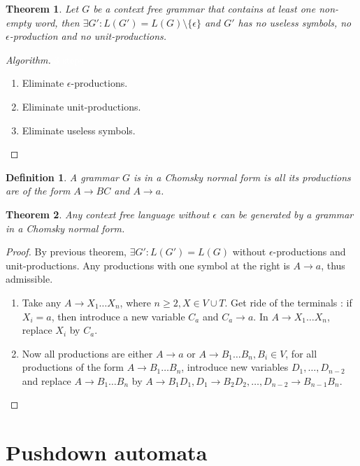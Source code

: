 \documentclass[a4paper,11pt]{article}
\newcommand{\white}[1]{{\textcolor{white}{#1}}}
\newtheorem{mydef}{Definition}
\newtheorem{thm}{Theorem}[section]
\begin{document}
\begin{thm}
  Let $G$ be a context free grammar that contains at least one non-empty word,
  then $\exists G' : L(G') = L(G) \setminus \{\epsilon\}$ and $G'$ has no
  useless symbols, no $\epsilon$-production and no unit-productions.
\end{thm}

\begin{proof}[Algorithm]
  \white{3 steps}
  \begin{enumerate}
  \item Eliminate $\epsilon$-productions.
  \item Eliminate unit-productions.
  \item Eliminate useless symbols.
  \end{enumerate}
\end{proof}

\begin{mydef}
  A grammar $G$ is in a Chomsky normal form is all its productions are of the
  form $A \to BC$ and $A \to a$.
\end{mydef}

\begin{thm}
  Any context free language without $\epsilon$ can be generated by a grammar in
  a Chomsky normal form.
\end{thm}

\begin{proof}
  By previous theorem, $\exists G' : L(G') = L(G)$ without
  $\epsilon$-productions and unit-productions. Any productions with one symbol
  at the right is $A \to a$, thus admissible.

  \begin{enumerate}
  \item Take any $A \to X_1 \dots X_n$, where $n \geq 2, X \in V \cup T$. Get ride of
    the terminals : if $X_i = a$, then introduce a new variable $C_a$ and $C_a \to
    a$. In $A \to X_1 \dots X_n$, replace $X_i$ by $C_a$.
  \item Now all productions are either $A \to a$ or $A \to B_1 \dots B_n, B_i
    \in V$, for all productions of the form $A \to B_1 \dots B_n$, introduce new
    variables $D_1,\dots,D_{n-2}$ and replace $A \to B_1 \dots B_n$ by $A \to
    B_1D_1, D_1 \to B_2D_2, \dots, D_{n-2} \to B_{n-1}B_{n}$.
  \end{enumerate}
\end{proof}

\section{Pushdown automata}
\end{document}
